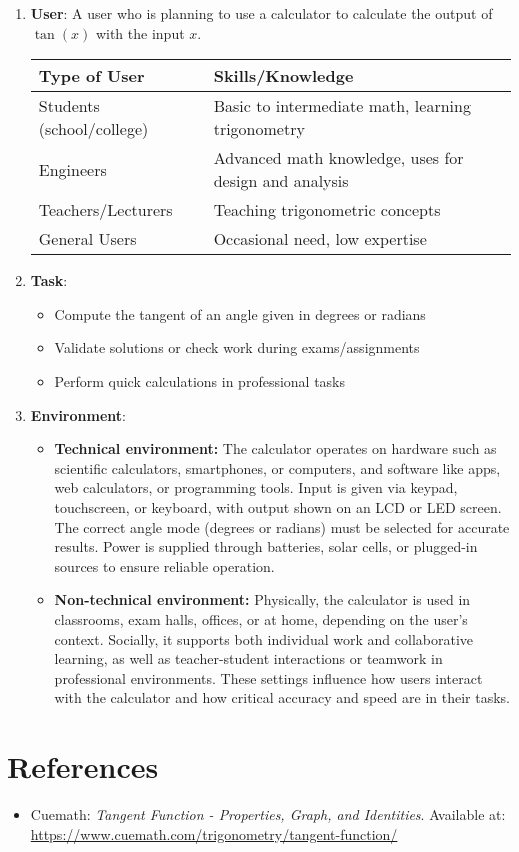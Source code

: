 \documentclass[11pt,a4paper,twoside]{article}
\begin{document}
\renewcommand\labelenumi{2.\arabic{enumi}}
\begin{enumerate}
\item 
\textbf{User}: A user who is planning to use a calculator to calculate the output of $\tan(x)$ with the input $x$.

\vspace{0.3cm}

\begin{tabularx}{\textwidth}{|l|X|}
\hline
\textbf{Type of User} & \textbf{Skills/Knowledge} \\ \hline
Students (school/college) & Basic to intermediate math, learning trigonometry \\ \hline
Engineers & Advanced math knowledge, uses for design and analysis \\ \hline
Teachers/Lecturers & Teaching trigonometric concepts \\ \hline
General Users & Occasional need, low expertise \\ \hline
\end{tabularx}

\vspace{0.3cm}

\item
\textbf{Task}: 
\begin{itemize}
\item Compute the tangent of an angle given in degrees or radians
\item Validate solutions or check work during exams/assignments
\item Perform quick calculations in professional tasks
\end{itemize}

\item
\textbf{Environment}:
  \begin{itemize}
  \item \textbf{Technical environment:} The calculator operates on hardware such as scientific calculators, smartphones, or computers, and software like apps, web calculators, or programming tools. Input is given via keypad, touchscreen, or keyboard, with output shown on an LCD or LED screen. The correct angle mode (degrees or radians) must be selected for accurate results. Power is supplied through batteries, solar cells, or plugged-in sources to ensure reliable operation.
  \item \textbf{Non-technical environment:} Physically, the calculator is used in classrooms, exam halls, offices, or at home, depending on the user’s context. Socially, it supports both individual work and collaborative learning, as well as teacher-student interactions or teamwork in professional environments. These settings influence how users interact with the calculator and how critical accuracy and speed are in their tasks.
  \end{itemize}
\end{enumerate}

\section*{References}
\begin{itemize}
\item Cuemath: \textit{Tangent Function - Properties, Graph, and Identities}. Available at: \url{https://www.cuemath.com/trigonometry/tangent-function/}
\end{itemize}
\end{document}
